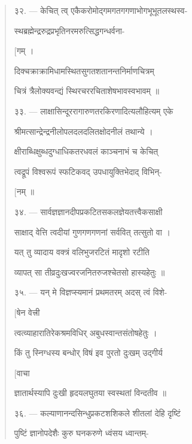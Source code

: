 \documentclass[a4paper, 11pt, oneside, french, landscape, twocolumn]{article}
\begin{document}
\begin{quotation}
\texthindi{३२}. --- \texthindi{केचित् त्व् एकैकरोमोद्गमगतगगणाभोगभूभूतलस्थस्व-}

\texthindi{स्थब्रह्मेन्द्ररुद्रप्रभृतिनरमरुत्सिद्धगन्धर्वना-}

\hspace*{55mm}\texthindi{[गम् ।}

\texthindi{दिक्चक्राक्रामिधामस्थितसुगतशतानन्तनिर्माणचित्रम्}

\texthindi{चित्रं त्रैलोक्यवन्द्यं स्थिरचररचिताशेषभावस्वभावम् ॥}

\bigskip

\texthindi{३३}. --- \texthindi{लाक्षासिन्दूररागारुणतरकिरणादित्यलौहित्यम् एके}

\texthindi{श्रीमत्सान्द्रेन्द्रनीलोपलदलदलितक्षोदनीलं तथान्ये ।}

\texthindi{क्षीराब्धिक्षुब्धदुग्धाधिकतरधवलं काञ्चनाभं च केचित्}

\texthindi{त्वद्रूपं विश्वरूपं स्फटिकवद् उपधायुक्तिभेदाद् विभिन्-}

\hspace*{55mm}\texthindi{[नम् ॥}

\bigskip

\texthindi{३४}. --- \texthindi{सार्वज्ञज्ञानदीपप्रकटितसकलज्ञेयतत्त्वैकसाक्षी}

\texthindi{साक्षाद् वेत्ति त्वदीयां गुणगणगणनां सर्ववित् तत्सुतो वा ।}

\texthindi{यत् तु व्यादाय वक्त्रं वलिभुजरटितं मादृशो रटीति}

\texthindi{व्यापत् सा तीव्रदुःखज्वरजनितरुजश्चेतसो हास्यहेतुः ॥}

\bigskip

\texthindi{३५}. --- \texthindi{यन् मे विज्ञप्स्यमानं प्रथमतरम् अदस् त्वं विशे-}

\hspace*{55mm}\texthindi{[षेन वेत्त्री}

\texthindi{त्वत्व्याहारातिरेकश्रमविधिर् अबुधस्वान्तसंतोषहेतुः ।}

\texthindi{किं तु स्निग्धस्य बन्धोर् विषं इव पुरतो दुःखम् उद्गीर्य}

\hspace*{55mm}\texthindi{[वाचा}

\texthindi{ज्ञातार्थस्यापि दुःखी हृदयलघुतया स्वस्थतां विन्दतीव ॥}

\bigskip

\texthindi{३६}. --- \texthindi{कल्याणानन्दसिन्धुप्रकटशशिकले शीतलां देहि दृष्टिं}

\texthindi{पुष्टिं ज्ञानोपदेशैः कुरु घनकरुणे ध्वंसय ध्वान्तम्-}


\end{quotation}
\end{document}
